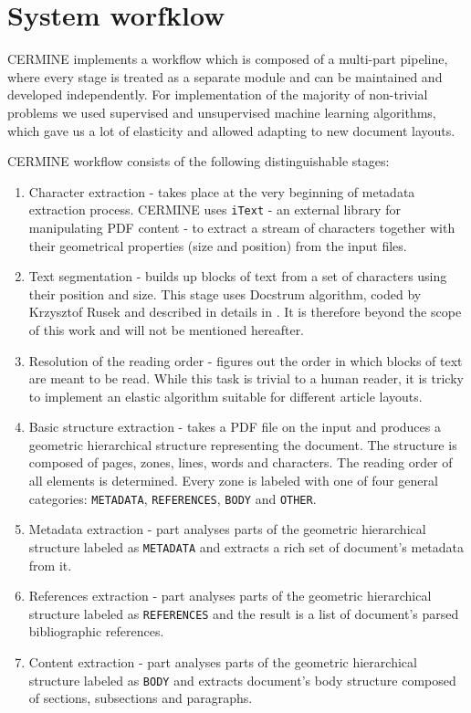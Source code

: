 \chapter{System worfklow}

CERMINE implements a workflow which is composed of a multi-part pipeline, where every stage is treated as a separate module and can be maintained and developed independently. For implementation of the majority of non-trivial problems we used supervised and unsupervised machine learning algorithms, which gave us a lot of elasticity and allowed adapting to new document layouts.

CERMINE workflow consists of the following distinguishable stages:
\begin{enumerate}
    \item {Character extraction} - takes place at the very beginning of metadata extraction process. CERMINE uses \verb+iText+ - an external library for manipulating PDF content - to extract a stream of characters together with their geometrical properties (size and position) from the input files.
    \item {Text segmentation} - builds up blocks of text from a set of characters using their position and size. This stage uses Docstrum algorithm, coded by Krzysztof Rusek and described in details in \cite{O'Gorman1993}. It is therefore beyond the scope of this work and will not be mentioned hereafter.
    \item {Resolution of the reading order} - figures out the order in which blocks of text are meant to be read. While this task is trivial to a human reader, it is tricky to implement an elastic algorithm suitable for different article layouts.
    \item {Basic structure extraction} - takes a PDF file on the input and produces a geometric hierarchical structure representing the document. The structure is composed of pages, zones, lines, words and characters. The reading order of all elements is determined. Every zone is labeled with one of four general categories: \verb+METADATA+, \verb+REFERENCES+, \verb+BODY+ and \verb+OTHER+.
    \item {Metadata extraction} - part analyses parts of the geometric hierarchical structure labeled as \verb+METADATA+ and extracts a rich set of document's metadata from it.
    \item {References extraction} - part analyses parts of the geometric hierarchical structure labeled as \verb+REFERENCES+ and the result is a list of document's parsed bibliographic references.
    \item {Content extraction} - part analyses parts of the geometric hierarchical structure labeled as \verb+BODY+ and extracts document's body structure composed of sections, subsections and paragraphs. 
\end{enumerate}
